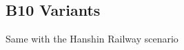 \documentclass{article}
\begin{document}
\begin{CJK}{UTF8}{min}
\subsection*{B10 Variants}
Same with the Hanshin Railway scenario

























\end{CJK}
\end{document}
